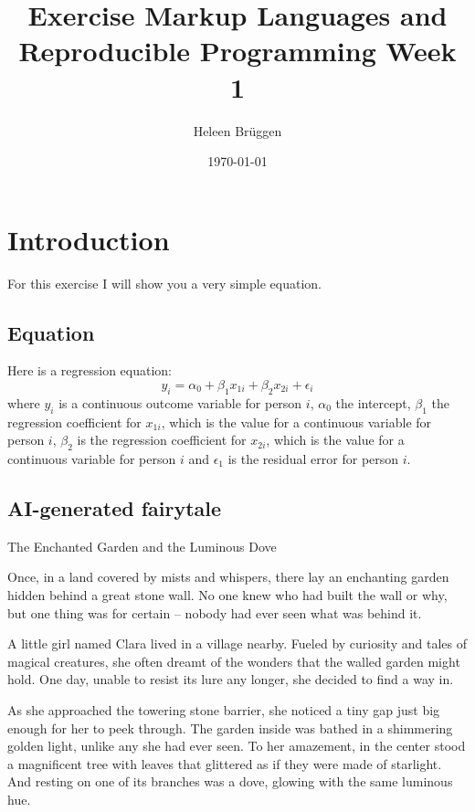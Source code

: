 \documentclass[10pt, a4paper, titlepage]{article}
\title{Exercise Markup Languages and Reproducible Programming Week 1}
\author{Heleen Brüggen}
\date{\today}
\begin{document}
\maketitle
\newpage

\section{Introduction}

For this exercise I will show you a very simple equation.

\subsection{Equation}
Here is a regression equation: 
\begin{equation} 
y_i = \alpha_0 + \beta_1 x_{1i} + \beta_2 x_{2i} + \epsilon_i 
\end{equation}
where $y_i$ is a continuous outcome variable for person $i$, $\alpha_0$ the intercept, $\beta_1$ the regression coefficient for $x_{1i}$, which is the value for a continuous variable for person $i$,  $\beta_2$ is the regression coefficient for $x_{2i}$, which is the value for a continuous variable for person $i$ and $\epsilon_1$ is the residual error for person $i$. 

\subsection{AI-generated fairytale}
The Enchanted Garden and the Luminous Dove

Once, in a land covered by mists and whispers, there lay an enchanting garden hidden behind a great stone wall. No one knew who had built the wall or why, but one thing was for certain – nobody had ever seen what was behind it.

A little girl named Clara lived in a village nearby. Fueled by curiosity and tales of magical creatures, she often dreamt of the wonders that the walled garden might hold. One day, unable to resist its lure any longer, she decided to find a way in.

As she approached the towering stone barrier, she noticed a tiny gap just big enough for her to peek through. The garden inside was bathed in a shimmering golden light, unlike any she had ever seen. To her amazement, in the center stood a magnificent tree with leaves that glittered as if they were made of starlight. And resting on one of its branches was a dove, glowing with the same luminous hue.
\end{document}
